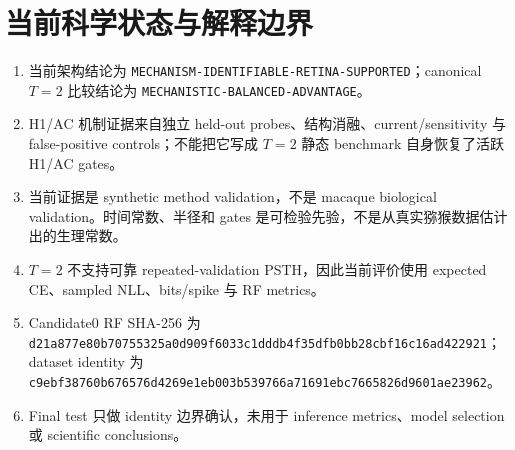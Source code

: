 \documentclass[UTF8,12pt,a4paper]{ctexart}
\numberwithin{equation}{section}
\begin{document}
\section{当前科学状态与解释边界}

\begin{enumerate}
\item 当前架构结论为 \texttt{MECHANISM-IDENTIFIABLE-RETINA-SUPPORTED}；canonical $T=2$ 比较结论为 \texttt{MECHANISTIC-BALANCED-ADVANTAGE}。
\item H1/AC 机制证据来自独立 held-out probes、结构消融、current/sensitivity 与 false-positive controls；不能把它写成 $T=2$ 静态 benchmark 自身恢复了活跃 H1/AC gates。
\item 当前证据是 synthetic method validation，不是 macaque biological validation。时间常数、半径和 gates 是可检验先验，不是从真实猕猴数据估计出的生理常数。
\item $T=2$ 不支持可靠 repeated-validation PSTH，因此当前评价使用 expected CE、sampled NLL、bits/spike 与 RF metrics。
\item Candidate0 RF SHA-256 为
\texttt{d21a877e80b70755\allowbreak{}325a0d909f6033c1\allowbreak{}dddb4f35dfb0bb28\allowbreak{}cbf16c16ad422921}；dataset identity 为
\texttt{c9ebf38760b67657\allowbreak{}6d4269e1eb003b53\allowbreak{}9766a71691ebc766\allowbreak{}5826d9601ae23962}。
\item Final test 只做 identity 边界确认，未用于 inference metrics、model selection 或 scientific conclusions。
\end{enumerate}
\end{document}
